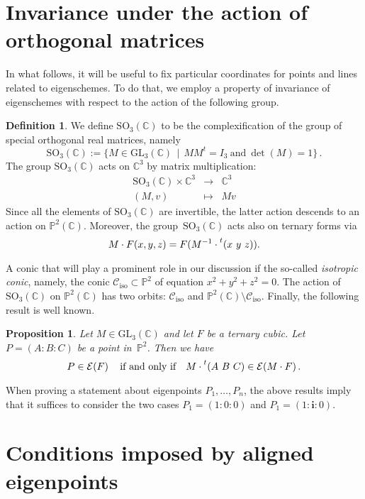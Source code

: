 \documentclass[11pt, a4paper, reqno, captions=tableheading,bibliography=totoc]{scrartcl}
\theoremstyle{plain}
\newtheorem{prop}[lemma]{Proposition}
\theoremstyle{definition}
\newtheorem{definition}[lemma]{Definition}
\newcommand{\C}{\mathbb{C}}
\newcommand{\p}{\mathbb{P}}
\newcommand{\iso}{\mathcal{C}_{\mathrm{iso}}}
\newcommand{\Eig}[1]{\mathcal{E}\!\left( {#1} \right)}
\newcommand{\iii}{\textbf{i}}
\begin{document}
\section{Invariance under the action of orthogonal matrices}
\label{invariance}

In what follows, it will be useful to fix particular coordinates for points and lines related to eigenschemes. To do that, we employ a property of invariance of eigenschemes with respect to the action of the following group.

\begin{definition}
 We define $\mathrm{SO}_3(\mathbb{C})$ to be the complexification of the group of special orthogonal real matrices, namely
 \[
  \mathrm{SO}_3(\mathbb{C}) :=
  \bigl\{
   M \in \mathrm{GL}_3(\C) \, \mid \,
   M M^t = I_3 \  \text{and} \  \det(M) = 1
  \bigr\} \,.
 \]
 The group $\mathrm{SO}_3(\mathbb{C})$ acts on $\C^3$ by matrix multiplication:
 \[
  \begin{array}{ccc}
   \mathrm{SO}_3(\mathbb{C}) \times \C^3 & \rightarrow & \C^3 \\
   (M, v) & \mapsto & Mv
  \end{array}
 \]
 Since all the elements of $\mathrm{SO}_3(\mathbb{C})$ are invertible, the latter action descends to an action on $\p^2(\C)$.
 Moreover, the group~$\mathrm{SO}_3(\mathbb{C})$ acts also on ternary forms via
 \[
  M \cdot F(x,y,z) = F(M^{-1} \cdot \prescript{t} {}( x \ y \ z )  ).
 \]
\end{definition}

A conic that will play a prominent role in our discussion if the so-called \emph{isotropic conic}, namely, the conic $\iso \subset \p^2$ of equation $x^2 + y^2 + z^2 = 0$. The action of $\mathrm{SO}_3(\mathbb{C})$ on $\p^2(\C)$ has two orbits: $\iso$ and $\p^2(\C) \setminus \iso$. Finally, the following result is well known.

\begin{prop}
 Let $M \in \mathrm{GL}_3(\C)$ and let $F$ be a ternary cubic.
 Let $P = (A: B: C)$ be a point in~$\p^2$.
 Then we have
 \[
  P \in \Eig{F}
  \quad \text{if and only if} \quad
  M \cdot \prescript{t} {}(A \ B \ C) \in \Eig{M \cdot F}.
 \]
\end{prop}

When proving a statement about eigenpoints $P_1, \dotsc, P_n$, the above results imply that it suffices to consider the two cases $P_1 = (1:0:0)$ and $P_1 = (1:\iii:0)$.

\section{Conditions imposed by aligned eigenpoints}
\label{conditions}
\end{document}
